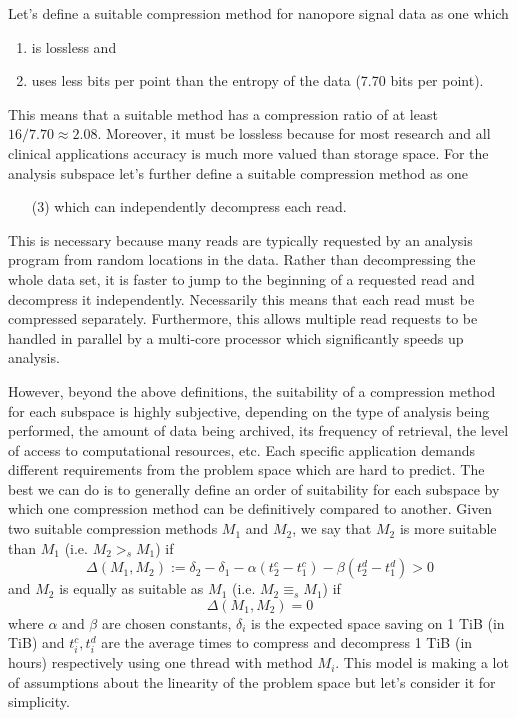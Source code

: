 Let's define a suitable compression method for nanopore signal data as
one which
\begin{enumerate}
	\item is lossless and
	\item uses less bits per point than the entropy of the data (7.70 bits per point).
\end{enumerate}
This means that a suitable method has a compression ratio of at least $16/7.70 \approx 2.08$.
Moreover, it must be lossless because for most research and all clinical
applications accuracy is much more valued than storage space. For
the analysis subspace let's further define a suitable compression method as one
\begin{enumerate}
	\item[(3)] which can independently decompress each read.
\end{enumerate}
This is necessary because many
reads are typically requested by an analysis program from random locations in
the data. Rather than decompressing the whole data set, it is faster to jump to
the beginning of a requested read and decompress it independently.
Necessarily this means that each read must be compressed separately.
Furthermore, this allows multiple read requests to be handled in parallel by a
multi-core processor which significantly speeds up analysis.

However, beyond the above definitions, the suitability of a compression method
for each subspace is highly subjective, depending on the type of analysis being
performed, the amount of data being archived, its frequency of retrieval, the
level of access to computational resources, etc. Each specific application
demands different requirements from the problem space which are hard to predict.
The best we can do is to generally define an order of suitability for each
subspace by which one compression method can be definitively compared to
another. Given two suitable compression methods $M_1$ and $M_2$, we say that
$M_2$ is more suitable than $M_1$ (i.e. $M_2>_sM_1$) if
\[\Delta(M_1,M_2):=\delta_2-\delta_1 - \alpha(t^c_2-t^c_1) - \beta(t^d_2-t^d_1) > 0\]
and $M_2$ is equally as suitable as $M_1$ (i.e. $M_2\equiv_sM_1$) if
\[\Delta(M_1,M_2)= 0\]
where $\alpha$ and $\beta$ are chosen constants, $\delta_i$ is the expected
space saving on 1 TiB (in TiB) and $t^c_i,t^d_i$ are the average times to
compress and decompress 1 TiB (in hours) respectively using one thread with
method $M_i$. This model is making a lot of assumptions about the linearity of
the problem space but let's consider it for simplicity.

